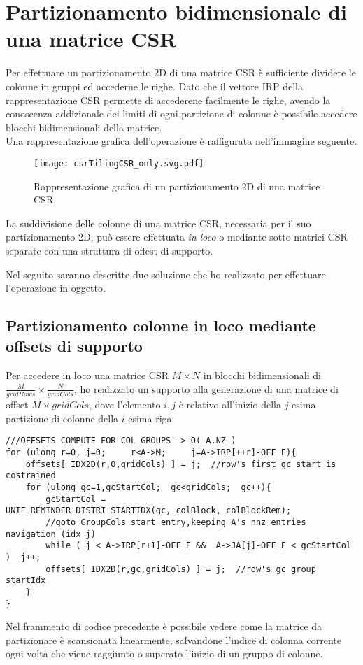 \section{Partizionamento bidimensionale di una matrice CSR}	\label{chSpMMAux:CSR2DPARTI}
Per effettuare un partizionamento 2D di una matrice CSR è sufficiente
dividere le colonne in gruppi ed accederne le righe.
Dato che il vettore IRP della rappresentazione CSR permette di accederene facilmente le righe,
avendo la conoscenza addizionale dei limiti di ogni partizione di colonne è possibile accedere blocchi bidimensionali
della matrice.\\
Una rappresentazione grafica dell'operazione è raffigurata nell'immagine seguente.\\
\begin{figure}[H]
  \centering \texttt{[image: csrTilingCSR\_only.svg.pdf]} 
  \caption[partizionamento 2D CSR]
  {Rappresentazione grafica di un partizionamento 2D di una matrice CSR, \cite{adaptiveTilingSpMM}}
  \decoRule \label{fig:csrTilingCSR_only}
\end{figure}

La suddivisione delle colonne di una matrice CSR, necessaria per il suo partizionamento 2D, 
può essere effettuata \emph{in loco} o mediante sotto matrici CSR separate con una struttura di offest di supporto.

Nel seguito saranno descritte due soluzione che ho realizzato per effettuare l'operazione in oggetto.\\

\subsection{Partizionamento colonne in loco mediante offsets di supporto} 
\label{chSpMMAux:csrColPartitioning}
Per accedere in loco una matrice CSR $M\times N$ in blocchi bidimensionali di $\frac{M}{gridRows}\times\frac{N}{gridCols}$, 
ho realizzato un supporto alla generazione di una matrice di offset $M\times gridCols$, dove l'elemento
$i,j$ è relativo all'inizio della $j$-esima partizione di colonne della $i$-esima riga.\\
\begin{lstlisting}
///OFFSETS COMPUTE FOR COL GROUPS -> O( A.NZ )
for (ulong r=0, j=0;     r<A->M;     j=A->IRP[++r]-OFF_F){
    offsets[ IDX2D(r,0,gridCols) ] = j;  //row's first gc start is costrained
    for (ulong gc=1,gcStartCol;  gc<gridCols;  gc++){
        gcStartCol = UNIF_REMINDER_DISTRI_STARTIDX(gc,_colBlock,_colBlockRem);
        //goto GroupCols start entry,keeping A's nnz entries navigation (idx j)
        while ( j < A->IRP[r+1]-OFF_F &&  A->JA[j]-OFF_F < gcStartCol )  j++;
        offsets[ IDX2D(r,gc,gridCols) ] = j;  //row's gc group startIdx
    }
}
\end{lstlisting}
Nel frammento di codice precedente è possibile vedere come la matrice da partizionare è scansionata
linearmente, salvandone l'indice di colonna corrente ogni volta che 
viene raggiunto o superato l'inizio di un gruppo di colonne.\\

